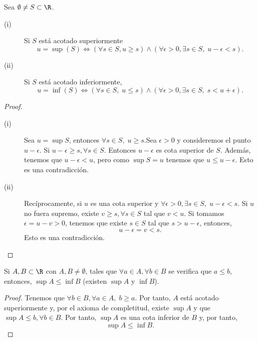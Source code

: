 \begin{fprop}[]
\normalfont Sea $\displaystyle \emptyset \neq S \subset \R $. 
\begin{description}
\item[(i)] Si $\displaystyle S $ está acotado superiormente
	\[u = \sup\left(S\right) \iff (\forall s \in S, u \geq s) \land (\forall \epsilon > 0, \exists s \in S, \; u - \epsilon < s)  .\]
\item[(ii)] Si $\displaystyle S $ está acotado inferiormente, 
	\[u = \inf\left(S\right) \iff \left(\forall s \in S, \; u \leq s\right) \land \left(\forall \epsilon>0, \exists s \in S, \; s < u + \epsilon\right) .\]
\end{description}
\end{fprop}

\begin{proof}
\begin{description}
\item[(i)] Sea $\displaystyle u = \sup S $, entonces $\displaystyle \forall s \in S, \; u \geq s $.Sea $\displaystyle  \epsilon>0 $ y consideremos el punto $\displaystyle u - \epsilon $. Si $\displaystyle u - \epsilon \geq s, \forall s \in S $. Entonces $\displaystyle u-\epsilon  $ es cota superior de $\displaystyle S $. Además, tenemos que $\displaystyle u - \epsilon < u $, pero como $\displaystyle \sup S = u $ tenemos que $\displaystyle u \leq u - \epsilon  $. Esto es una contradicción. 
\item[(ii)] Recíprocamente, si $\displaystyle u $ es una cota superior y $\displaystyle \forall \epsilon>0, \exists s \in S, \; u - \epsilon < s $. Si $\displaystyle u $ no fuera supremo, existe $\displaystyle v \geq s, \forall s \in S $ tal que $\displaystyle v < u $. Si tomamos $\displaystyle \epsilon = u - v > 0 $, tenemos que existe $\displaystyle s \in S $ tal que $\displaystyle s > u - \epsilon $, entonces,
\[ u - \epsilon = v < s .\]
Esto es una contradicción.
\end{description}
\end{proof}

\begin{fprop}[]
\normalfont Si $\displaystyle A, B \subset \R $ con $\displaystyle A, B \neq \emptyset $, tales que $\displaystyle \forall a \in A, \forall b \in B $ se verifica que $\displaystyle a\leq b $, entonces, $\displaystyle \sup A \leq \inf B $ (existen $\displaystyle \sup A $ y $\displaystyle \inf B $).
\end{fprop}

\begin{proof}
Tenemos que $\displaystyle \forall b \in B, \forall a \in A, \; b \geq a $. Por tanto, $\displaystyle A $ está acotado superiormente y, por el axioma de completitud, existe $\displaystyle \sup A $ y que $\displaystyle \sup A \leq b, \forall b \in B $. Por tanto, $\displaystyle \sup A $ es una cota inferior de $\displaystyle B $ y, por tanto, 
\[\sup A \leq \inf B .\]
\end{proof}

